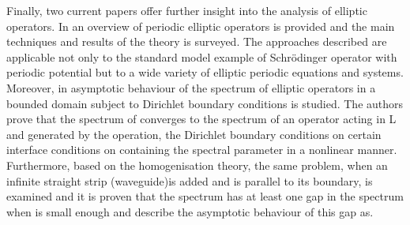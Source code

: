 Finally, two current papers offer further insight into the analysis of elliptic operators. In \cite{kuchment2016overview} an overview of periodic elliptic operators is provided and the main techniques and results of the theory is surveyed. The approaches described are applicable not only to the standard model example of Schrödinger operator with periodic potential but to a wide variety of elliptic periodic equations and systems. Moreover, in \cite{khrabustovskyi2016spectral} asymptotic behaviour of the spectrum of elliptic operators  in a bounded domain subject to Dirichlet boundary conditions is studied. The authors prove that the spectrum of converges to the spectrum of an operator acting in L and generated by the operation, the Dirichlet boundary conditions on certain interface conditions on containing the spectral parameter in a nonlinear manner. Furthermore, based on the homogenisation theory, the same problem, when an infinite straight strip (waveguide)is added and is parallel to its boundary, is examined and it is proven that the spectrum has at least one gap in the spectrum when is small enough and describe the asymptotic behaviour of this gap as.